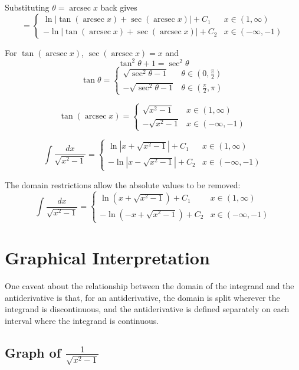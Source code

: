 \documentclass[12pt]{article}
\DeclareMathOperator{\arcsec}{arcsec}
\begin{document}
Substituting \(\theta = \arcsec x\) back gives
\[
=
\begin{cases}
\ln |\tan(\arcsec x) + \sec(\arcsec x)| + C_1
& x \in (1,\infty) \\[0.8em]
-\ln |\tan(\arcsec x) + \sec(\arcsec x)| + C_2
& x \in (-\infty,-1)
\end{cases}
\]

For \(\tan(\arcsec x)\), \(\sec(\arcsec x)=x\) and
\[
\tan^2 \theta + 1 = \sec^2 \theta
\]
\[
\tan \theta
=
\begin{cases}
\sqrt{\sec^2 \theta - 1}
& \theta \in (0,\frac{\pi}{2}) \\[0.8em]
-\sqrt{\sec^2 \theta - 1}
& \theta \in (\frac{\pi}{2},\pi)
\end{cases}
\]

\[
\tan(\arcsec x)
=
\begin{cases}
\sqrt{x^2 - 1}
& x \in (1,\infty) \\[0.8em]
-\sqrt{x^2 - 1}
& x \in (-\infty,-1)
\end{cases}
\]

\[
\int \frac{dx}{\sqrt{x^2 - 1}}
=
\begin{cases}
\ln \left|x+\sqrt{x^2 - 1}\right| + C_1
& x \in (1,\infty) \\[0.8em]
-\ln \left|x-\sqrt{x^2 - 1}\right| + C_2
& x \in (-\infty,-1)
\end{cases}
\]

The domain restrictions allow the absolute values to be removed:
\[
\boxed{
\int \frac{dx}{\sqrt{x^2 - 1}}
=
\begin{cases}
\ln \left(x+\sqrt{x^2 - 1}\right) + C_1
& x \in (1,\infty) \\[0.8em]
-\ln \left(-x+\sqrt{x^2 - 1}\right) + C_2
& x \in (-\infty,-1)
\end{cases}
}
\]


\section{Graphical Interpretation}

One caveat about the relationship between the domain of the integrand and the antiderivative is that, for an antiderivative, the domain is split wherever the integrand is discontinuous, and the antiderivative is defined separately on each interval where the integrand is continuous.

\subsection*{Graph of \(\frac{1}{\sqrt{x^2-1}}\)}
\end{document}
